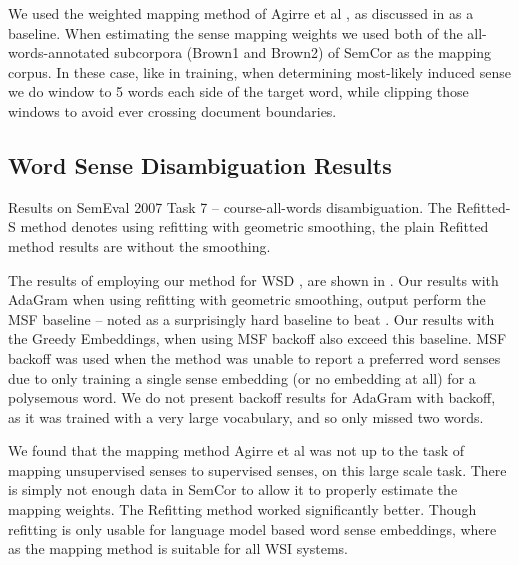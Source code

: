 \documentclass{sig-alternate}
\begin{document}
We used the weighted mapping method of Agirre et al \parencite{agirre2006}, as discussed in  as a baseline.
When estimating the sense mapping weights we used both of the all-words-annotated subcorpora (Brown1 and Brown2) of SemCor as the mapping corpus.
In these case, like in training, when determining most-likely induced sense we do window to 5 words each side of the target word, while clipping those windows to avoid ever crossing document boundaries.

\subsection{Word Sense Disambiguation Results}
\begin{table}
	\begin{adjustbox}{max width=\columnwidth}
	\end{adjustbox}

	\caption{Results on SemEval 2007 Task 7 -- course-all-words disambiguation. The Refitted-S method denotes using refitting with geometric smoothing, the plain Refitted method results are without the smoothing. 
	} \label{samevalres}
\end{table}

The results of employing our method for WSD , are shown in . Our results with AdaGram when using refitting with geometric smoothing, output perform the MSF baseline -- noted as a surprisingly hard baseline to beat \parencite{Chen2014}. Our results with the Greedy Embeddings, when using MSF backoff also exceed this baseline.
MSF backoff was used when the method was unable to report a preferred word senses due to only training a single sense embedding (or no embedding at all) for a polysemous word.
We do not present backoff results for AdaGram with backoff, as it was trained with a very large vocabulary, and so only missed two words.

We found that the mapping method  Agirre et al \parencite{agirre2006}  was not up to the task of mapping unsupervised senses to supervised senses, on this large scale task. There is simply not enough data in SemCor to allow it to properly estimate the mapping weights. The Refitting method worked significantly better. Though refitting is only usable for language model based word sense embeddings, where as the mapping method is suitable for all WSI systems.
\end{document}
